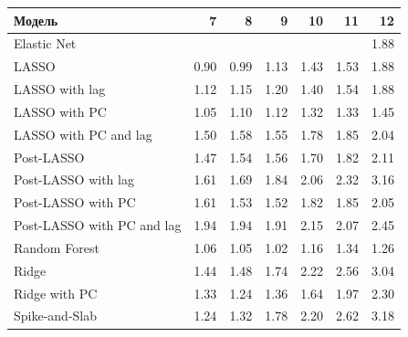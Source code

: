 \documentclass[c, dvipsnames]{beamer}  %
\begin{document}
 \begin{frame}
\begin{table}[ht]
\small
\centering
\begin{tabular}{lrrrrrr}
  \hline
  
Модель & 7 & 8 & 9 & 10 & 11 & 12 \\ 
  \hline
Elastic Net &  &  &  &  &  & 1.88 \\ 
  LASSO & 0.90 & 0.99 & 1.13 & 1.43 & 1.53 & 1.88 \\ 
  LASSO with lag & 1.12 & 1.15 & 1.20 & 1.40 & 1.54 & 1.88 \\ 
 LASSO with PC & 1.05 & 1.10 & 1.12 & 1.32 & 1.33 & 1.45 \\ 
 LASSO with PC and lag &1.50 & 1.58 & 1.55 & 1.78 & 1.85 & 2.04 \\ 
  Post-LASSO & 1.47 & 1.54 & 1.56 & 1.70 & 1.82 & 2.11 \\ 
 Post-LASSO with lag & 1.61 & 1.69 & 1.84 & 2.06 & 2.32 & 3.16 \\ 
  Post-LASSO with PC & 1.61 & 1.53 & 1.52 & 1.82 & 1.85 & 2.05 \\ 
  Post-LASSO with PC  and lag & 1.94 & 1.94 & 1.91 & 2.15 & 2.07 & 2.45 \\ 
  Random Forest & 1.06 & 1.05 & 1.02 & 1.16 & 1.34 & 1.26 \\ 
  Ridge & 1.44 & 1.48 & 1.74 & 2.22 & 2.56 & 3.04 \\ 
  Ridge with PC & 1.33 & 1.24 & 1.36 & 1.64 & 1.97 & 2.30 \\ 
  Spike-and-Slab & 1.24 & 1.32 & 1.78 & 2.20 & 2.62 & 3.18 \\
   \hline
\end{tabular}
\end{table}
\end{frame}
\end{document}
